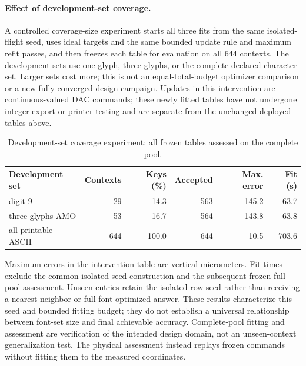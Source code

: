 \paragraph{Effect of development-set coverage.} A controlled coverage-size experiment starts all three fits from the same isolated-flight seed, uses ideal targets and the same bounded update rule and maximum refit passes, and then freezes each table for evaluation on all 644 contexts. The development sets use one glyph, three glyphs, or the complete declared character set. Larger sets cost more; this is not an equal-total-budget optimizer comparison or a new fully converged design campaign. Updates in this intervention are continuous-valued DAC commands; these newly fitted tables have not undergone integer export or printer testing and are separate from the unchanged deployed tables above.

\begin{table}[htbp]\centering\small\caption{Development-set coverage experiment; all frozen tables assessed on the complete pool.}\begin{tabular}{lrrrrr}\toprule Development set & Contexts & Keys (\%) & Accepted & Max. error & Fit (s)\\\midrule

digit 9 & 29 & 14.3 & 563 & 145.2 & 63.7 \\

three glyphs AMO & 53 & 16.7 & 564 & 143.8 & 63.8 \\

all printable ASCII & 644 & 100.0 & 644 & 10.5 & 703.6 \\

\bottomrule\end{tabular}\end{table}

Maximum errors in the intervention table are vertical micrometers. Fit times exclude the common isolated-seed construction and the subsequent frozen full-pool assessment. Unseen entries retain the isolated-row seed rather than receiving a nearest-neighbor or full-font optimized answer. These results characterize this seed and bounded fitting budget; they do not establish a universal relationship between font-set size and final achievable accuracy. Complete-pool fitting and assessment are verification of the intended design domain, not an unseen-context generalization test. The physical assessment instead replays frozen commands without fitting them to the measured coordinates.

